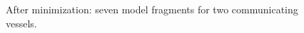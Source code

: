 \documentclass{article} %
\begin{document}
\begin{figure}[ht]
{}

\caption{After minimization: seven model fragments for two communicating vessels.}
\label{cv_frags}
\end{figure}
\end{document}
